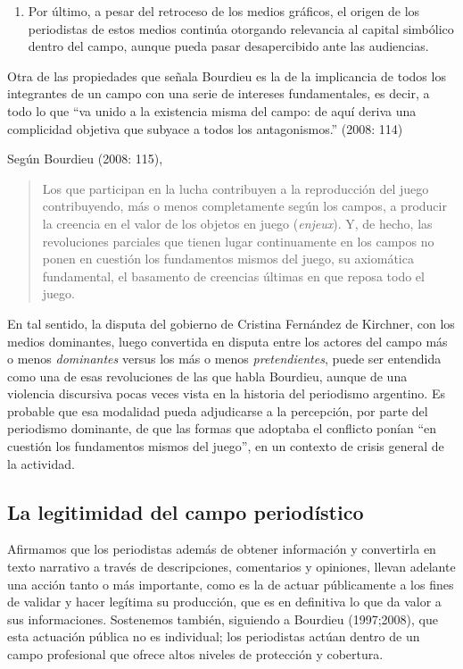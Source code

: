 \begin{enumerate}
\def\labelenumi{\alph{enumi})}
\setcounter{enumi}{4}
\item
  Por último, a pesar del retroceso de los medios gráficos, el origen de los periodistas de estos medios continúa otorgando relevancia al capital simbólico dentro del campo, aunque pueda pasar desapercibido ante las audiencias.
\end{enumerate}

Otra de las propiedades que señala Bourdieu es la de la implicancia de todos los integrantes de un campo con una serie de intereses fundamentales, es decir, a todo lo que ``va unido a la existencia misma del campo: de aquí deriva una complicidad objetiva que subyace a todos los antagonismos.'' (2008: 114)

Según Bourdieu (2008: 115),

\begin{quote}
Los que participan en la lucha contribuyen a la reproducción del juego contribuyendo, más o menos completamente según los campos, a producir la creencia en el valor de los objetos en juego (\emph{enjeux}). Y, de hecho, las revoluciones parciales que tienen lugar continuamente en los campos no ponen en cuestión los fundamentos mismos del juego, su axiomática fundamental, el basamento de creencias últimas en que reposa todo el juego.
\end{quote}

En tal sentido, la disputa del gobierno de Cristina Fernández de Kirchner, con los medios dominantes, luego convertida en disputa entre los actores del campo más o menos \emph{dominantes} versus los más o menos \emph{pretendientes}, puede ser entendida como una de esas revoluciones de las que habla Bourdieu, aunque de una violencia discursiva pocas veces vista en la historia del periodismo argentino. Es probable que esa modalidad pueda adjudicarse a la percepción, por parte del periodismo dominante, de que las formas que adoptaba el conflicto ponían ``en cuestión los fundamentos mismos del juego'', en un contexto de crisis general de la actividad.

\subsection{La legitimidad del campo periodístico}

Afirmamos que los periodistas además de obtener información y convertirla en texto narrativo a través de descripciones, comentarios y opiniones, llevan adelante una acción tanto o más importante, como es la de actuar públicamente a los fines de validar y hacer legítima su producción, que es en definitiva lo que da valor a sus informaciones. Sostenemos también, siguiendo a Bourdieu (1997;2008), que esta actuación pública no es individual; los periodistas actúan dentro de un campo profesional que ofrece altos niveles de protección y cobertura.

